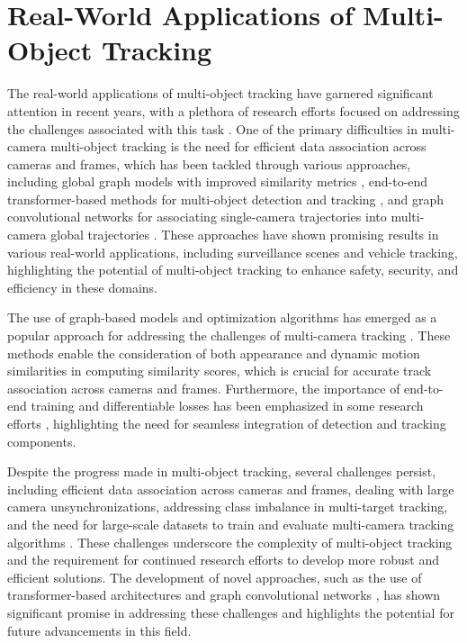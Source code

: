 \documentclass[conference]{IEEEtran}
\begin{document}
\section{Real-World Applications of Multi-Object Tracking}
The real-world applications of multi-object tracking have garnered significant attention in recent years, with a plethora of research efforts focused on addressing the challenges associated with this task \cite{Challenge of Multi-Camera Tracking}. One of the primary difficulties in multi-camera multi-object tracking is the need for efficient data association across cameras and frames, which has been tackled through various approaches, including global graph models with improved similarity metrics \cite{An equalised global graphical model-based approach for multi-camera object tracking}, end-to-end transformer-based methods for multi-object detection and tracking \cite{MCTR: Multi Camera Tracking Transformer}, and graph convolutional networks for associating single-camera trajectories into multi-camera global trajectories \cite{Graph Convolutional Network for Multi-Target Multi-Camera Vehicle Tracking}. These approaches have shown promising results in various real-world applications, including surveillance scenes and vehicle tracking, highlighting the potential of multi-object tracking to enhance safety, security, and efficiency in these domains.

The use of graph-based models and optimization algorithms has emerged as a popular approach for addressing the challenges of multi-camera tracking \cite{An equalised global graphical model-based approach for multi-camera object tracking, Multi-camera Multi-Object Tracking}. These methods enable the consideration of both appearance and dynamic motion similarities in computing similarity scores, which is crucial for accurate track association across cameras and frames. Furthermore, the importance of end-to-end training and differentiable losses has been emphasized in some research efforts \cite{MCTR: Multi Camera Tracking Transformer}, highlighting the need for seamless integration of detection and tracking components.

Despite the progress made in multi-object tracking, several challenges persist, including efficient data association across cameras and frames, dealing with large camera unsynchronizations, addressing class imbalance in multi-target tracking, and the need for large-scale datasets to train and evaluate multi-camera tracking algorithms \cite{Challenge of Multi-Camera Tracking, Graph Convolutional Network for Multi-Target Multi-Camera Vehicle Tracking, MCTR: Multi Camera Tracking Transformer}. These challenges underscore the complexity of multi-object tracking and the requirement for continued research efforts to develop more robust and efficient solutions. The development of novel approaches, such as the use of transformer-based architectures \cite{MCTR: Multi Camera Tracking Transformer} and graph convolutional networks \cite{Graph Convolutional Network for Multi-Target Multi-Camera Vehicle Tracking}, has shown significant promise in addressing these challenges and highlights the potential for future advancements in this field.
\end{document}
